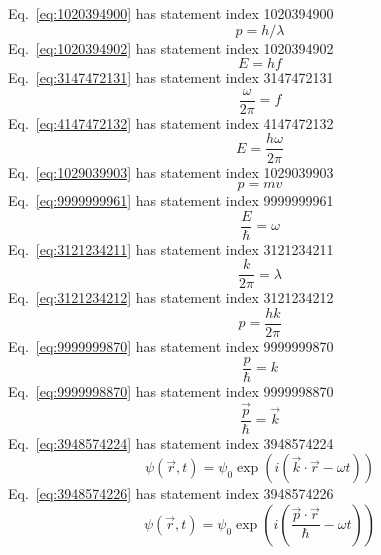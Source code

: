 \documentclass[12pt]{report}
\begin{document}
Eq.~\ref{eq:1020394900} has statement index 1020394900
\begin{equation}
p = h/\lambda
\label{eq:1020394900}
\end{equation}
Eq.~\ref{eq:1020394902} has statement index 1020394902
\begin{equation}
E = h f
\label{eq:1020394902}
\end{equation}
Eq.~\ref{eq:3147472131} has statement index 3147472131
\begin{equation}
\frac{\omega}{2 \pi}= f
\label{eq:3147472131}
\end{equation}
Eq.~\ref{eq:4147472132} has statement index 4147472132
\begin{equation}
E = \frac{h \omega}{2 \pi}
\label{eq:4147472132}
\end{equation}
Eq.~\ref{eq:1029039903} has statement index 1029039903
\begin{equation}
p = m v
\label{eq:1029039903}
\end{equation}
Eq.~\ref{eq:9999999961} has statement index 9999999961
\begin{equation}
\frac{E}{\hbar} = \omega 
\label{eq:9999999961}
\end{equation}
Eq.~\ref{eq:3121234211} has statement index 3121234211
\begin{equation}
\frac{k}{2\pi}=\lambda
\label{eq:3121234211}
\end{equation}
Eq.~\ref{eq:3121234212} has statement index 3121234212
\begin{equation}
p = \frac{h k}{2\pi}
\label{eq:3121234212}
\end{equation}
Eq.~\ref{eq:9999999870} has statement index 9999999870
\begin{equation}
\frac{p}{\hbar} = k
\label{eq:9999999870}
\end{equation}
Eq.~\ref{eq:9999998870} has statement index 9999998870
\begin{equation}
\frac{\vec{p}}{\hbar} = \vec{k}
\label{eq:9999998870}
\end{equation}
Eq.~\ref{eq:3948574224} has statement index 3948574224
\begin{equation}
\psi(\vec{r},t) = \psi_0 \exp\left(i\left(\vec{k}\cdot\vec{r} - \omega t \right) \right)
\label{eq:3948574224}
\end{equation}
Eq.~\ref{eq:3948574226} has statement index 3948574226
\begin{equation}
\psi(\vec{r},t) = \psi_0 \exp\left(i\left(\frac{\vec{p}\cdot\vec{r}}{\hbar} - \omega t \right) \right)
\label{eq:3948574226}
\end{equation}
\end{document}
